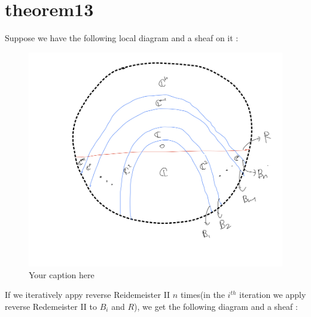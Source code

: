 \section{theorem13}
\begin{theorem}
\end{theorem}

Suppose we have the following local diagram and a sheaf on it :

\begin{figure}[H] %
    \centering
    \includegraphics[width=\linewidth]{diagrams/theorem13/1.png} %
    \caption{Your caption here}
    \label{fig:your-label}
\end{figure}

If we iteratively appy reverse Reidemeister \RN{2} $n$ times(in the $i^{th}$ iteration we apply reverse Redemeister \RN{2} to $B_i$ and $R$), we get the following diagram and a sheaf :

